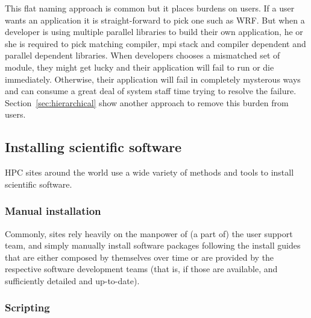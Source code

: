 This flat naming approach is common but it places burdens on users.
If a user wants an application it is straight-forward to pick one such
as WRF.  But when a developer is using multiple parallel libraries to
build their own application, he or she is required to pick matching
compiler, mpi stack and compiler dependent and parallel dependent
libraries.  When developers chooses a mismatched set of module, they
might get lucky and their application will fail to run or die
immediately.  Otherwise, their application will fail in completely
mysterous ways and can consume a great deal of system staff time
trying to resolve the failure.  Section~\ref{sec:hierarchical} show
another approach to remove this burden from users.


%
%


\subsection{Installing scientific software}
\label{sec:installing}

HPC sites around the world use a wide variety of methods and tools to
install scientific software.

\subsubsection{Manual installation}

Commonly, sites rely heavily on the manpower of (a part of)
the user support team, and simply manually install software packages following
the install guides that are either composed by themselves over time or are provided
by the respective software development teams (that is, if those are available, and
sufficiently detailed and up-to-date).

\subsubsection{Scripting}

